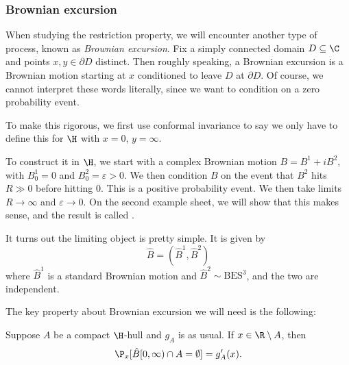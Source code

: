 \documentclass[a4paper]{article}
\newcommand\BES{\mathrm{BES}}
\begin{document}
\subsubsection*{Brownian excursion}
When studying the restriction property, we will encounter another type of process, known as \emph{Brownian excursion}. Fix a simply connected domain $D \subseteq \C$ and points $x, y \in \partial D$ distinct. Then roughly speaking, a Brownian excursion is a Brownian motion starting at $x$ conditioned to leave $D$ at $\partial D$. Of course, we cannot interpret these words literally, since we want to condition on a zero probability event.

To make this rigorous, we first use conformal invariance to say we only have to define this for $\H$ with $x = 0$, $y = \infty$.

To construct it in $\H$, we start with a complex Brownian motion $B = B^1 + i B^2$, with $B^1_0 = 0$ and $B_0^2 = \varepsilon > 0$. We then condition $B$ on the event that $B^2$ hits $R \gg 0$ before hitting $0$. This is a positive probability event. We then take limits $R \to \infty$ and $\varepsilon \to 0$. On the second example sheet, we will show that this makes sense, and the result is called .

It turns out the limiting object is pretty simple. It is given by
\[
  \hat{B} = (\hat{B}^1, \hat{B}^2)
\]
where $\hat{B}^1$ is a standard Brownian motion and $\hat{B}^2 \sim \BES^3$, and the two are independent.

The key property about Brownian excursion we will need is the following:
\begin{prop}
  Suppose $A$ be a compact $\H$-hull and $g_A$ is as usual. If $x \in \R \setminus A$, then
  \[
    \P_x[\hat{B}[0, \infty) \cap A = \emptyset] = g_A'(x).
  \]
\end{prop}
\end{document}
